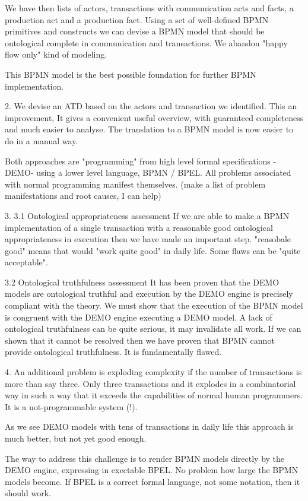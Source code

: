 \documentclass[]{article}
\begin{document}
We have then lists of actors, transactions with communication acts and facts,
a production act and a production fact.
Using a set of well-defined BPMN primitives and constructs we can devise
a BPMN model that should be ontological complete in communication and transactions.
We abandon "happy flow only" kind of modeling.

This BPMN model is the best possible foundation for further BPMN implementation.


2.
We devise an ATD based on the actors and transaction we identified.
This an improvement, It gives a convenient useful overview, with guaranteed completeness
and much easier to analyse.
The translation to a BPMN model is now easier to do in a manual way.

Both approaches are "programming" from high level formal specifications -DEMO- using
a lower level language, BPMN / BPEL. All problems associated with normal programming 
manifest themselves. (make a list of problem manifestations and root causes, I can help)


3.
3.1 Ontological appropriateness assessment
If we are able to make a BPMN implementation of a single transaction with a reasonable
good ontological appropriateness in execution then we have made an important step.
"reasobale good" means that would "work quite good" in daily life.
Some flaws can be "quite acceptable".

3.2 Ontological truthfulness assessment
It has been proven that the DEMO models are ontological truthful and execution by the DEMO engine
is precisely compliant with the theory. 
We must show that the execution of the BPMN model is congruent with the DEMO engine
executing a DEMO model.
A lack of ontological truthfulness can be quite serious, it may invalidate all work.
If we can shown that it cannot be resolved then we have proven that BPMN cannot provide
ontological truthfulness. It is fundamentally flawed.


4.
An additional problem is exploding complexity if the number of transactions
is more than say three. Only three transactions and it explodes in a combinatorial
way in such a way that it exceeds the capabilities of normal human programmers.
It is a not-programmable system (!).

As we see DEMO models with tens of transactions in daily life this approach is much better,
but not yet good enough.

The way to address this challenge is to render BPMN models directly by the DEMO engine,
expressing in exectable BPEL.
No problem how large the BPMN models become. If BPEL is a correct formal language, not some
notation, then it should work.
\end{document}
